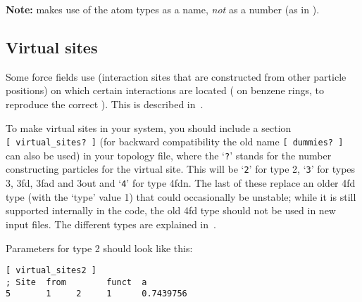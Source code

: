 {\bf Note:} {\gromacs} makes use of the atom types as a name, {\em
not} as a number (as {\eg} in {\gromos}).


%
%

\subsection{Virtual sites}
\label{sec:vsitetop}
Some force fields use 
(interaction sites that are constructed from other particle positions)
on which certain interactions are located
({\eg} on benzene rings, to reproduce the correct
). This is described in~.

To make virtual sites in your system, you should include a section
{\tt [~virtual_sites?~]} (for backward compatibility the old name
{\tt [~dummies?~]} can also be used) in your topology file,
where the `{\tt ?}' stands
for the number constructing particles for the virtual site. This will be
`{\tt 2}' for type 2, `{\tt 3}' for types 3, 3fd, 3fad and 3out and
`{\tt 4}' for type 4fdn. The last of these replace an older 4fd type (with the `type' value 1) 
that could occasionally be unstable; while it is still supported internally
in the code, the old 4fd type should not be used in new input files.
 The different types are explained
in~.

Parameters for type 2 should look like this:
{\small
\begin{verbatim}
[ virtual_sites2 ]
; Site  from        funct  a
5       1     2     1      0.7439756
\end{verbatim}}

